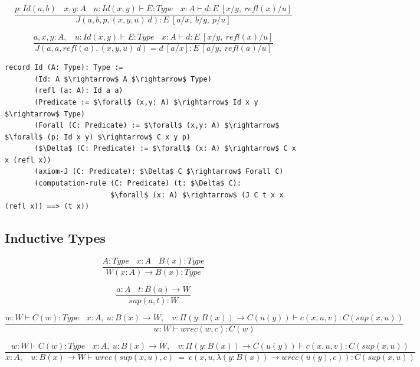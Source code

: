 \documentclass[11pt,oneside]{article}
\begin{document}
\begin{equation}
\tag{$J$-elimination}
\dfrac
  {p:Id(a,b)\ \ \ \ x,y:A\ \ \ \ u:Id(x,y) \vdash E:Type\ \ \ \ x:A \vdash d: E\ [x/y,\ refl(x)/u]}
  {J(a,b,p,(x,y,u)\ d) : E\ [a/x,\ b/y,\ p/u]}
\end{equation}


\begin{equation}
\tag{$Id$-computation}
\dfrac
  {a,x,y:A,\ \ \ \ u:Id(x,y) \vdash E:Type\ \ \ \ x:A \vdash d:E\ [x/y,\ refl(x)/u]}
  {J(a,a,refl(a),(x,y,u)\ d) = d\ [a/x] : E\ [a/y,\ refl(a)/u]}
\end{equation}

\begin{lstlisting}[mathescape=true]
record Id (A: Type): Type :=
       (Id: A $\rightarrow$ A $\rightarrow$ Type)
       (refl (a: A): Id a a)
       (Predicate := $\forall$ (x,y: A) $\rightarrow$ Id x y $\rightarrow$ Type)
       (Forall (C: Predicate) := $\forall$ (x,y: A) $\rightarrow$ $\forall$ (p: Id x y) $\rightarrow$ C x y p)
       ($\Delta$ (C: Predicate) := $\forall$ (x: A) $\rightarrow$ C x x (refl x))
       (axiom-J (C: Predicate): $\Delta$ C $\rightarrow$ Forall C)
       (computation-rule (C: Predicate) (t: $\Delta$ C):
                         $\forall$ (x: A) $\rightarrow$ (J C t x x (refl x)) ==> (t x))
\end{lstlisting}

\subsection{Inductive Types}

\begin{equation}
\tag{$W$-formation}
\dfrac
  {A:Type\ \ \ \ x:A\ \ \ \ B(x):Type}
  {W (x:A) \rightarrow B(x) : Type}
\end{equation}

\begin{equation}
\tag{$W$-intro}
\dfrac
  {a:A\ \ \ \ t: B(a) \rightarrow W}
  {sup(a,t) : W}
\end{equation}

\begin{equation}
\tag{$W$-elimination}
\dfrac
  {w: W \vdash C(w) : Type\ \ \ \ x:A,\ u:B(x) \rightarrow W,\ \ \ \ v:\Pi (y:B(x)) \rightarrow C(u(y)) \vdash c(x,u,v):C(sup(x,u))}
  {w:W \vdash wrec(w,c):C(w)}
\end{equation}

\begin{equation}
\tag{$W$-computation}
\dfrac
  {w: W \vdash C(w) : Type\ \ \ \ x:A,\ u:B(x) \rightarrow W,\ \ \ \ v:\Pi (y:B(x)) \rightarrow C(u(y)) \vdash c(x,u,v):C(sup(x,u))}
  {x:A,\ \ \ \ u:B(x) \rightarrow W \vdash wrec(sup(x,u),c)\ =\ c(x,u,\lambda (y:B(x)) \rightarrow wrec(u(y),c)):C(sup(x,u))}
\end{equation}
\end{document}
